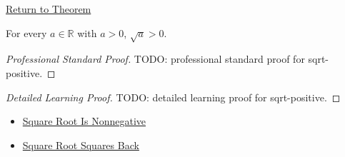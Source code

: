 \newpage
{}
\label{prf:sqrt-positive}

\begin{remark*}[Return]
\hyperref[thm:sqrt-positive]{Return to Theorem}
\end{remark*}

\begin{theorem*}
For every $a\in\mathbb{R}$ with $a>0$, $\sqrt a>0$.
\end{theorem*}

\begin{proof}[Professional Standard Proof]
\LRAProofBodyStart
TODO: professional standard proof for sqrt-positive.
\end{proof}

\begin{proof}[Detailed Learning Proof]
\LRAProofBodyStart
TODO: detailed learning proof for sqrt-positive.
\end{proof}

\begin{remark*}
\end{remark*}

\begin{dependencies}
\begin{itemize}
  \item \hyperref[thm:sqrt-nonnegative]{Square Root Is Nonnegative}
  \item \hyperref[thm:sqrt-square]{Square Root Squares Back}
\end{itemize}
\end{dependencies}

\clearpage
